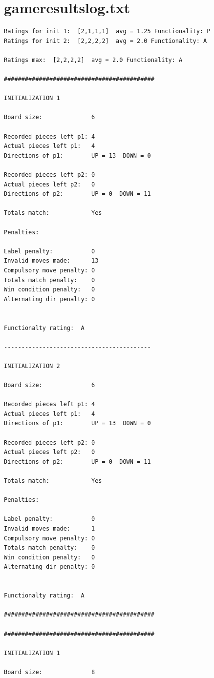 \documentclass[9pt]{article}%
\begin{document}
\section*{game\textunderscore results\textunderscore log.txt}
\begin{lstlisting}[style=cmdoutput,numbers=none]
Ratings for init 1:  [2,1,1,1]  avg = 1.25 Functionality: P
Ratings for init 2:  [2,2,2,2]  avg = 2.0 Functionality: A

Ratings max:  [2,2,2,2]  avg = 2.0 Functionality: A

###########################################

INITIALIZATION 1

Board size:              6

Recorded pieces left p1: 4
Actual pieces left p1:   4
Directions of p1:        UP = 13  DOWN = 0

Recorded pieces left p2: 0
Actual pieces left p2:   0
Directions of p2:        UP = 0  DOWN = 11

Totals match:            Yes

Penalties:

Label penalty:           0
Invalid moves made:      13
Compulsory move penalty: 0
Totals match penalty:    0
Win condition penalty:   0
Alternating dir penalty: 0


Functionalty rating:  A

------------------------------------------

INITIALIZATION 2

Board size:              6

Recorded pieces left p1: 4
Actual pieces left p1:   4
Directions of p1:        UP = 13  DOWN = 0

Recorded pieces left p2: 0
Actual pieces left p2:   0
Directions of p2:        UP = 0  DOWN = 11

Totals match:            Yes

Penalties:

Label penalty:           0
Invalid moves made:      1
Compulsory move penalty: 0
Totals match penalty:    0
Win condition penalty:   0
Alternating dir penalty: 0


Functionalty rating:  A

###########################################

###########################################

INITIALIZATION 1

Board size:              8


\end{lstlisting}
\end{document}
